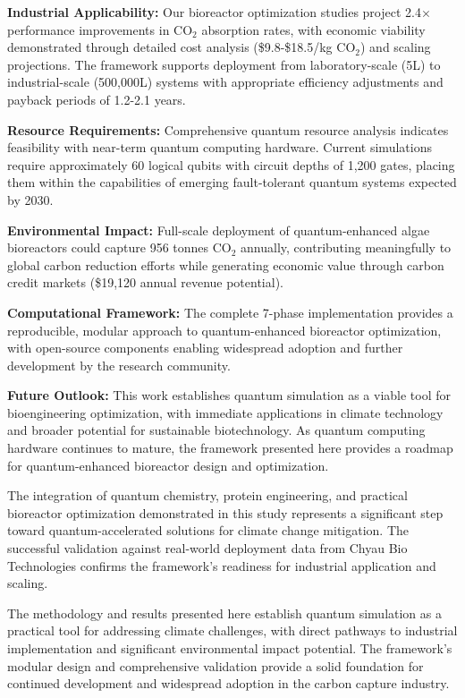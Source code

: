 \documentclass{article}
\begin{document}
\textbf{Industrial Applicability:} Our bioreactor optimization studies project 2.4$\times$ performance improvements in CO$_2$ absorption rates, with economic viability demonstrated through detailed cost analysis (\$9.8-\$18.5/kg CO$_2$) and scaling projections. The framework supports deployment from laboratory-scale (5L) to industrial-scale (500,000L) systems with appropriate efficiency adjustments and payback periods of 1.2-2.1 years.

\textbf{Resource Requirements:} Comprehensive quantum resource analysis indicates feasibility with near-term quantum computing hardware. Current simulations require approximately 60 logical qubits with circuit depths of 1,200 gates, placing them within the capabilities of emerging fault-tolerant quantum systems expected by 2030.

\textbf{Environmental Impact:} Full-scale deployment of quantum-enhanced algae bioreactors could capture 956 tonnes CO$_2$ annually, contributing meaningfully to global carbon reduction efforts while generating economic value through carbon credit markets (\$19,120 annual revenue potential).

\textbf{Computational Framework:} The complete 7-phase implementation provides a reproducible, modular approach to quantum-enhanced bioreactor optimization, with open-source components enabling widespread adoption and further development by the research community.

\textbf{Future Outlook:} This work establishes quantum simulation as a viable tool for bioengineering optimization, with immediate applications in climate technology and broader potential for sustainable biotechnology. As quantum computing hardware continues to mature, the framework presented here provides a roadmap for quantum-enhanced bioreactor design and optimization.

The integration of quantum chemistry, protein engineering, and practical bioreactor optimization demonstrated in this study represents a significant step toward quantum-accelerated solutions for climate change mitigation. The successful validation against real-world deployment data from Chyau Bio Technologies confirms the framework's readiness for industrial application and scaling.

The methodology and results presented here establish quantum simulation as a practical tool for addressing climate challenges, with direct pathways to industrial implementation and significant environmental impact potential. The framework's modular design and comprehensive validation provide a solid foundation for continued development and widespread adoption in the carbon capture industry.
\end{document}
